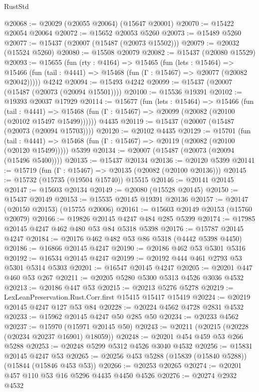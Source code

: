 \begin{lexlean}{RustStd}
\begin{coremodule}
@20068 := @20029 (@20055 @20064) (@15647 @20001)
@20070 := @15422 @20054 @20064
@20072 := @15652 @20053 @5260
@20073 := @15489 @5260
@20077 := @15437 (@20007 (@15487 (@20073 @15502)))
@20079 := @20032 (@15524 @5260)
@20080 := @15508 @20079
@20082 := @15437 (@20080 @15529)
@20093 := @15655
    (fun (rty : @4164) =>
    @15465
      (fun (lets : @15464) =>
      @15466 (fun (tail : @4441) => @15468 (fun (Γ : @15467) => @20077 (@20082 @20042)))))
    @4242
@20094 := @15493 @4242
@20099 := @15437 (@20007 (@15487 (@20073 (@20094 @15501))))
@20100 := @15536 @19391
@20102 := @19393 @20037 @17929
@20114 := @15677
    (fun (lets : @15464) =>
    @15466
      (fun (tail : @4441) =>
      @15468 (fun (Γ : @15467) => @20099 (@20082 (@20100 (@20102 @15497 @15499))))))
    @4435
@20119 := @15437 (@20007 (@15487 (@20073 (@20094 @15703))))
@20120 := @20102 @4435
@20129 := @15701
    (fun (tail : @4441) => @15468 (fun (Γ : @15467) => @20119 (@20082 (@20100 (@20120 @15499)))))
    @5399
@20134 := @20007 (@15487 (@20073 (@20094 (@15496 @5400))))
@20135 := @15437 @20134
@20136 := @20120 @5399
@20141 := @15719 (fun (Γ : @15467) => @20135 (@20082 (@20100 @20136)))
@20145 := @15732 (@15735 (@19504 @15740)) @15515
@20146 := @20141 @20145
@20147 := @15603 @20134
@20149 := @20080 (@15528 @20145)
@20150 := @15437 @20149
@20153 := @15535 @20145 @19391 @20136
@20157 := @20147 (@20150 @20153) (@15755 @20006)
@20161 := @15603 @20149 @20153 (@15760 @20079)
@20166 := @19826 @20145 @4247 @484 @285 @5399
@20174 := @17985 @20145 @4247 @462 @480 @53 @84 @5318 @5398
@20176 := @15787 @20145 @4247
@20184 := @20176 @462 @482 @53 @86 @5318 (@4442 @5398 @4450)
@20186 := @16866 @20145 @4247
@20190 := @20186 @462 @53 @5301 @5316
@20192 := @16534 @20145 @4247
@20199 := @20192 @444 @461 @2793 @53 @5301 @5314 @5303
@20201 := @16547 @20145 @4247
@20205 := @20201 @447 @460 @53 @267
@20211 := @20205 @5280 @5300 @5313 @4526 @3036 @4532
@20213 := @20186 @447 @53
@20215 := @20213 @5276 @5278
@20219 := LexLeanPreservation.Rust.Corr.first @15415 @15417 @15419
@20224 := @20219 @20145 @4247 @127 @53 @84
@20228 := @20224 @4562 @4728 @2831 @4532
@20233 := @15962 @20145 @4247 @50 @285 @50
@20234 := @20233 @4562
@20237 := @15970 (@15971 @20145 @50)
@20243 := @20211 (@20215 (@20228 (@20234 @20237 @16901) @18059))
@20248 := @20201 @454 @459 @53 @266 @5288
@20253 := @20248 @5299 @5312 @4526 @3040 @4532
@20256 := @15831 @20145 @4247 @53
@20265 := @20256 @453 @5288 (@15839 (@15840 @5288)) (@15844 (@15846 @453 @53))
@20266 := @20253 @20265
@20274 := @20201 @457 @110 @53 @16 @5296 @4435 @4450 @4526
@20276 := @20274 @2932 @4532

\end{coremodule}
\end{lexlean}
